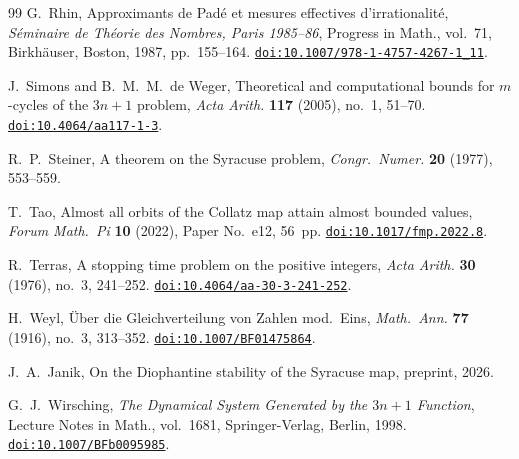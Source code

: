 \documentclass[manuscript]{aomart}
\theoremstyle{plain}
\theoremstyle{definition}
\theoremstyle{remark}
\numberwithin{equation}{section}
\begin{document}
\begin{thebibliography}{99}
G.~Rhin,
Approximants de Padé et mesures effectives d'irrationalité,
\emph{Séminaire de Théorie des Nombres, Paris 1985--86},
Progress in Math., vol.~71,
Birkhäuser, Boston, 1987, pp.~155--164.
\newblock \href{https://doi.org/10.1007/978-1-4757-4267-1_11}%
  {\texttt{doi:10.1007/978-1-4757-4267-1\_11}}.

J.~Simons and B.~M.~M.~de Weger,
Theoretical and computational bounds for $m$-cycles of the $3n+1$
problem,
\emph{Acta Arith.}
\textbf{117} (2005), no.~1, 51--70.
\newblock \href{https://doi.org/10.4064/aa117-1-3}%
  {\texttt{doi:10.4064/aa117-1-3}}.

R.~P.~Steiner,
A theorem on the Syracuse problem,
\emph{Congr.\ Numer.}
\textbf{20} (1977), 553--559.

T.~Tao,
Almost all orbits of the Collatz map attain almost bounded values,
\emph{Forum Math.\ Pi}
\textbf{10} (2022), Paper No.~e12, 56~pp.
\newblock \href{https://doi.org/10.1017/fmp.2022.8}%
  {\texttt{doi:10.1017/fmp.2022.8}}.

R.~Terras,
A stopping time problem on the positive integers,
\emph{Acta Arith.}
\textbf{30} (1976), no.~3, 241--252.
\newblock \href{https://doi.org/10.4064/aa-30-3-241-252}%
  {\texttt{doi:10.4064/aa-30-3-241-252}}.

H.~Weyl,
Über die Gleichverteilung von Zahlen mod.\ Eins,
\emph{Math.\ Ann.}
\textbf{77} (1916), no.~3, 313--352.
\newblock \href{https://doi.org/10.1007/BF01475864}%
  {\texttt{doi:10.1007/BF01475864}}.

J.~A.~Janik,
On the Diophantine stability of the Syracuse map,
preprint, 2026.

G.~J.~Wirsching,
\emph{The Dynamical System Generated by the $3n+1$ Function},
Lecture Notes in Math., vol.~1681,
Springer-Verlag, Berlin, 1998.
\newblock \href{https://doi.org/10.1007/BFb0095985}%
  {\texttt{doi:10.1007/BFb0095985}}.

\end{thebibliography}
\end{document}
